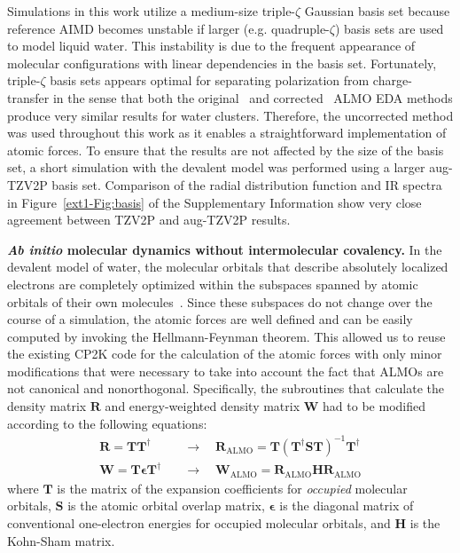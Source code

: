 \documentclass[10pt,amsmath,twocolumn,aps,prl,superscriptaddress,floatfix]{revtex4-1}
\begin{document}
Simulations in this work utilize a medium-size triple-$\zeta$ Gaussian basis set because reference AIMD becomes unstable if larger (e.g. quadruple-$\zeta$) basis sets are used to model liquid water. 
This instability is due to the frequent appearance of molecular configurations with linear dependencies in the basis set. 
Fortunately, triple-$\zeta$ basis sets appears optimal for separating polarization from charge-transfer in the sense that both the original~\cite{khaliullin2007unravelling} and corrected~\cite{horn2015polarization} ALMO EDA methods produce very similar results for water clusters. 
Therefore, the uncorrected method was used throughout this work as it enables a straightforward implementation of atomic forces. 
To ensure that the results are not affected by the size of the basis set, a short simulation with the devalent model was performed using a larger aug-TZV2P basis set. Comparison of the radial distribution function and IR spectra in Figure~\ref{ext1-Fig:basis} of the Supplementary Information show very close agreement between TZV2P and aug-TZV2P results. 

\textbf{\textit{Ab initio} molecular dynamics without intermolecular covalency.} In the devalent model of water, the molecular orbitals that describe absolutely localized electrons are completely optimized within the subspaces spanned by atomic orbitals of their own molecules~\cite{khaliullin2006efficient}. Since these subspaces do not change over the course of a simulation, the atomic forces are well defined and can be easily computed by invoking the Hellmann-Feynman theorem. This allowed us to reuse the existing CP2K code for the calculation of the atomic forces with only minor modifications that were necessary to take into account the fact that ALMOs are not canonical and nonorthogonal. Specifically, the subroutines that calculate the density matrix $\mathbf{R}$ and  energy-weighted density matrix $\mathbf{W}$ had to be modified according to the following equations:
%
\begin{equation}
\begin{split}
\mathbf{R} = \mathbf{T} \mathbf{T}^{\dagger} \quad &\rightarrow \quad \mathbf{R}_{\text{ALMO}} = \mathbf{T} (\mathbf{T}^{\dagger} \mathbf{S} \mathbf{T})^{-1}\mathbf{T}^{\dagger} \\
\mathbf{W} = \mathbf{T} \mathbf{\epsilon} \mathbf{T}^{\dagger} \quad &\rightarrow \quad \mathbf{W}_{\text{ALMO}}  = \mathbf{R}_{\text{ALMO}} \mathbf{H} \mathbf{R}_{\text{ALMO}}
\end{split}
\end{equation}
%
where $\mathbf{T}$ is the matrix of the expansion coefficients for \emph{occupied} molecular orbitals, $\mathbf{S}$ is the atomic orbital overlap matrix, $\mathbf{\epsilon}$ is the diagonal matrix of conventional one-electron energies for occupied molecular orbitals, and $\mathbf{H}$ is the Kohn-Sham matrix.
\end{document}
